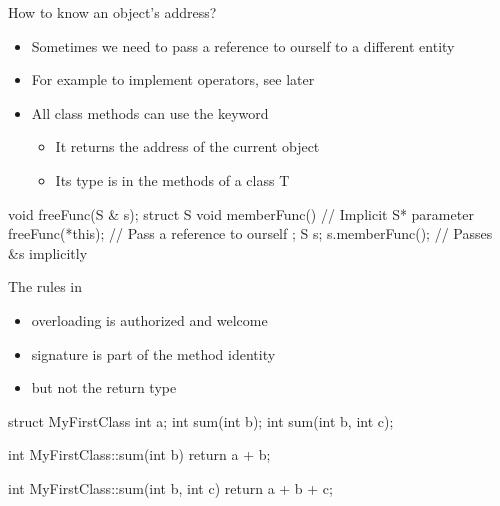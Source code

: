 \begin{frame}[fragile]
  \begin{block}{How to know an object's address?}
    \begin{itemize}
    \item Sometimes we need to pass a reference to ourself to a different entity
    \item For example to implement operators, see later
    \item All class methods can use the keyword 
      \begin{itemize}
        \item It returns the address of the current object
        \item Its type is  in the methods of a class {\ttfamily T}
      \end{itemize}
    \end{itemize}
  \end{block}
  \begin{cppcode}
    void freeFunc(S & s);
    struct S {
      void memberFunc() { // Implicit S* parameter
        freeFunc(*this);  // Pass a reference to ourself
      }
    };
    S s;
    s.memberFunc();       // Passes &s implicitly
  \end{cppcode}
\end{frame}

\begin{frame}[fragile]
  \begin{block}{The rules in \cpp}
    \begin{itemize}
    \item overloading is authorized and welcome
    \item signature is part of the method identity
    \item but not the return type
    \end{itemize}
  \end{block}
  \begin{cppcode}
    struct MyFirstClass {
      int a;
      int sum(int b);
      int sum(int b, int c);
    }

    int MyFirstClass::sum(int b) { return a + b; }

    int MyFirstClass::sum(int b, int c) {
      return a + b + c;
    }
  \end{cppcode}
\end{frame}
